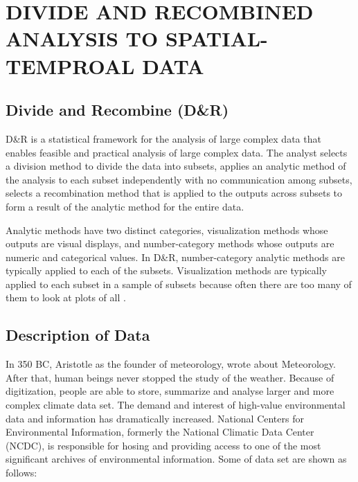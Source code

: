 \chapter{DIVIDE AND RECOMBINED ANALYSIS TO SPATIAL-TEMPROAL DATA}

\section{Divide and Recombine (D\&R)}

D\&R \cite{Guha:2012} is a statistical framework for the analysis of large complex
data that enables feasible and practical analysis of large complex data. The 
analyst selects a division method to divide the data into subsets, applies an 
analytic method of the analysis to each subset independently with no communication
among subsets, selects a recombination method that is applied to the outputs 
across subsets to form a result of the analytic method for the entire data.

Analytic methods have two distinct categories, visualization methods whose outputs
are visual displays, and number-category methods whose outputs are numeric and 
categorical values. In D\&R, number-category analytic methods are typically applied
to each of the subsets. Visualization methods are typically applied to each subset 
in a sample of subsets because often there are too many of them to look at plots of 
all \cite{Ryan:2013}.
 
\section{Description of Data}

In 350 BC, Aristotle as the founder of meteorology, wrote about Meteorology. After
that, human beings never stopped the study of the weather. Because of digitization,
people are able to store, summarize and analyse larger and more complex climate data 
set. The demand and interest of high-value environmental data and information has 
dramatically increased. National Centers for Environmental Information, formerly 
the National Climatic Data Center (NCDC), is responsible for hosing and providing 
access to one of the most significant archives of environmental information. Some 
of data set are shown as follows:

